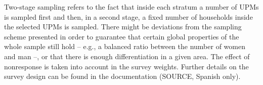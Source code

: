 Two-stage sampling refers to the fact that inside each stratum a number of UPMs is sampled first and then, in a second stage, a fixed number of households inside the selected UPMs is sampled.
There might be deviations from the sampling scheme presented in order to guarantee that certain global properties of the whole sample still hold – e.g., a balanced ratio between the number of women and man –, or that there is enough differentiation in a given area.
The effect of nonresponse is taken into account in the survey weights. Further details on the survey design can be found in the documentation (SOURCE, Spanish only).



\vspace{-0.4 cm}